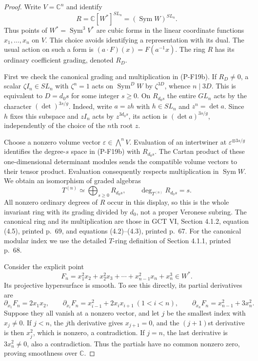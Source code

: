 \begin{proof}
Write $V=\mathbb C^n$ and identify
\[
 R=\mathbb C[W^*]^{SL_n}=(\operatorname{Sym}W)^{SL_n}.
 \tag{P-F19f}
\]
Thus points of $W^*=\operatorname{Sym}^3V^*$ are cubic forms in
the linear coordinate functions $x_1,\ldots,x_n$ on $V$.
This choice avoids identifying a representation with its dual.
The usual action on such a form is $(a\cdot F)(x)=F(a^{-1}x)$.
The ring $R$ has its ordinary coefficient grading, denoted $R_D$.

First we check the canonical grading and multiplication in (P-F19b).
If $R_D\ne0$, a scalar $\zeta I_n\in SL_n$ with $\zeta^n=1$
acts on $\operatorname{Sym}^D W$ by $\zeta^{3D}$, whence
$n\mid3D$. This is equivalent to $D=d_0s$ for some integer
$s\ge0$. On $R_{d_0s}$ the entire $GL_n$ acts by the character
$(\det)^{3s/g}$. Indeed, write $a=zh$ with $h\in SL_n$ and
$z^n=\det a$. Since $h$ fixes this subspace and $zI_n$ acts by
$z^{3d_0s}$, its action is $(\det a)^{3s/g}$, independently of
the choice of the $n$th root $z$.

Choose a nonzero volume vector $\varepsilon\in\bigwedge^nV$.
Evaluation of an intertwiner at $\varepsilon^{\otimes3s/g}$
identifies the degree-$s$ space in (P-F19b) with $R_{d_0s}$.
The Cartan product of these one-dimensional determinant modules
sends the compatible volume vectors to their tensor product.
Evaluation consequently respects multiplication in
$\operatorname{Sym}W$. We obtain an isomorphism of graded
algebras
\[
 T^{(n)}\simeq\bigoplus_{s\ge0}R_{d_0s},
 \qquad \deg_{T^{(n)}} R_{d_0s}=s.
 \tag{P-F19g}
\]
All nonzero ordinary degrees of $R$ occur in this display, so this
is the whole invariant ring with its grading divided by $d_0$,
not a proper Veronese subring. The canonical ring and its
multiplication are those in GCT VI, Section 4.1.2, equation (4.5),
printed p.~69, and equations (4.2)--(4.3), printed p.~67.
For the canonical modular index we use the detailed $T$-ring
definition of Section 4.1.1, printed p.~68.

Consider the explicit point
\[
 F_n=x_1^2x_2+x_2^2x_3+\cdots+x_{n-1}^2x_n+x_n^3
       \in W^*.
 \tag{P-F19h}
\]
Its projective hypersurface is smooth. To see this directly, its
partial derivatives are
\[
 \partial_{x_1}F_n=2x_1x_2,\qquad
 \partial_{x_i}F_n=x_{i-1}^2+2x_ix_{i+1}\ (1<i<n),\qquad
 \partial_{x_n}F_n=x_{n-1}^2+3x_n^2.
\]
Suppose they all vanish at a nonzero vector, and let $j$ be the
smallest index with $x_j\ne0$. If $j<n$, the $j$th derivative
gives $x_{j+1}=0$, and the $(j+1)$st derivative is then $x_j^2$,
which is nonzero, a contradiction. If $j=n$, the last derivative
is $3x_n^2\ne0$, also a contradiction. Thus the partials have
no common nonzero zero, proving smoothness over $\mathbb C$.


\end{proof}
